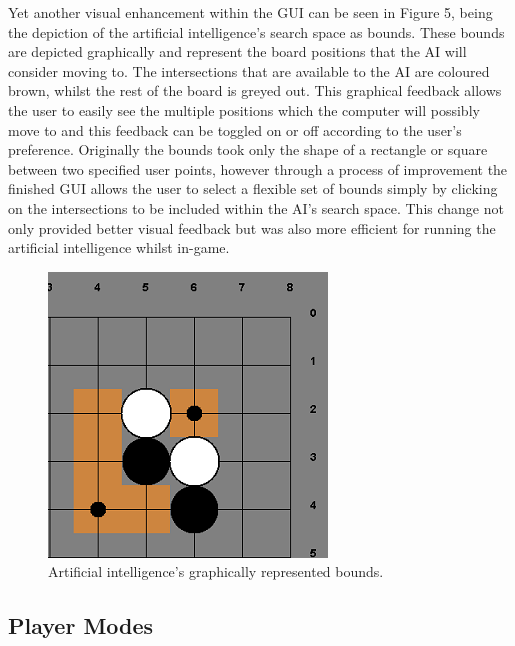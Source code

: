 \documentclass{l3proj}
\begin{document}
Yet another visual enhancement within the GUI can be seen in Figure 5, being the depiction of the artificial intelligence's search space as bounds. These bounds are depicted graphically and represent the board positions that the AI will consider moving to. The intersections that are available to the AI are coloured brown, whilst the rest of the board is greyed out. This graphical feedback allows the user to easily see the multiple positions which the computer will possibly move to and this feedback can be toggled on or off according to the user's preference. Originally the bounds took only the shape of a rectangle or square between two specified user points, however through a process of improvement the finished GUI allows the user to select a flexible set of bounds simply by clicking on the intersections to be included within the AI's search space. This change not only provided better visual feedback but was also more efficient for running the artificial intelligence whilst in-game.

\begin{figure}[H]
\centering
\includegraphics[scale=1]{Images/GUI-5-Bounds.png}
\caption{Artificial intelligence's graphically represented bounds.}
\end{figure}

\subsection{Player Modes}
\end{document}
